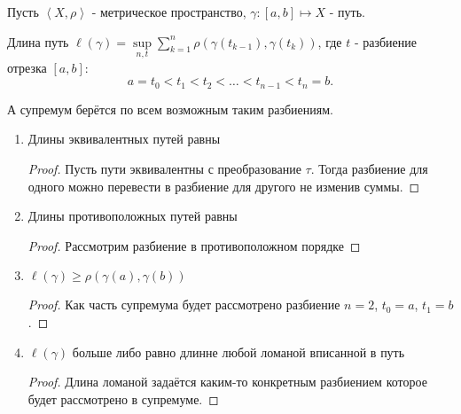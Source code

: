 
\begin{definition} \thmslashn 

    Пусть $\left<X, \rho\right>$ - метрическое пространство, $\gamma : [a, b] \mapsto X$ - путь.

    Длина путь $\ell(\gamma) = \sup\limits_{n, t} \sum\limits_{k=1}^{n} \rho(\gamma(t_{k-1}), \gamma(t_{k}))$, где $t$ - разбиение отрезка $[a, b]$:
    \[ a = t_0 < t_1 < t_2 < \ldots < t_{n-1} < t_{n} = b .\]

    А супремум берётся по всем возможным таким разбиениям.
\end{definition}
\begin{properties} \thmslashn

    \begin{enumerate}
        \item Длины эквивалентных путей равны
            \begin{proof} \thmslashn
            
                Пусть пути эквивалентны с преобразование $\tau$. Тогда разбиение для одного можно перевести в разбиение для другого не изменив суммы.
            \end{proof}
        \item Длины противоположных путей равны
            \begin{proof} \thmslashn
            
                Рассмотрим разбиение в противоположном порядке
            \end{proof}
        \item $\ell(\gamma) \ge \rho(\gamma(a), \gamma(b))$
            \begin{proof} \thmslashn
            
                Как часть супремума будет рассмотрено разбиение $n=2$, $t_{0} = a$, $t_{1} = b$.
            \end{proof}
        \item $\ell(\gamma)$ больше либо равно длинне любой ломаной вписанной в путь
            \begin{proof} \thmslashn
            
                Длина ломаной задаётся каким-то конкретным разбиением которое будет рассмотрено в супремуме.
            \end{proof}
    \end{enumerate}
\end{properties}
